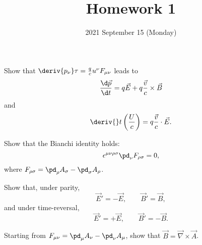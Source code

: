 \documentclass{phys151}
\title{Homework 1}
\date{2021 September 15 (Monday)}
\author{}
\begin{document}
\begin{problem}
  Show that \(\deriv {p_\nu} \tau = \frac q c u^\nu F_{\mu \nu}\) leads to
  \[
    \frac{\d \vec p}{\d t} = q \vec E + q \frac {\vec v} c \times \vec B
  \]
  and
  \[
    \deriv {} t \left(\frac U c\right) = q \frac {\vec v} c \cdot \vec E.
  \]
\end{problem}

\begin{solution}

\end{solution}

\begin{problem}
  Show that the Bianchi identity holds:
  \[
    \epsilon^{\mu \nu \rho \sigma} \pd_\nu F_{\rho \sigma} = 0,
  \]
  where \(F_{\rho \sigma} = \pd_\rho A_\sigma - \pd_\sigma A_\rho\).
\end{problem}

\begin{solution}

\end{solution}

\begin{problem}
  Show that, under parity,
  \[
    \vec E' = -\vec E, \qquad \vec B' = \vec B,
  \]
  and under time-reversal,
  \[
    \vec E' = +\vec E, \qquad \vec B' = -\vec B.
  \]
\end{problem}

\begin{solution}

\end{solution}

\begin{problem}
  Starting from \(F_{\mu \nu} = \pd_\mu A_\nu - \pd_\nu A_\mu\), show that
  \(\vec B = \vec \nabla \times \vec A\).
\end{problem}

\begin{solution}

\end{solution}
\end{document}
